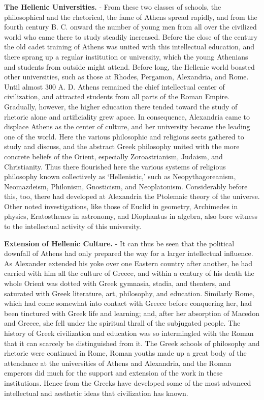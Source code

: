 \documentclass[
]{book}
\begin{document}
\textbf{The Hellenic Universities.} - From these two classes of schools, the philosophical and the rhetorical, the fame of Athens spread rapidly, and from the fourth century B. C. onward the number of young men from all over the civilized world who came there to study steadily increased. Before the close of the century the old cadet training of Athens was united with this intellectual education, and there sprang up a regular institution or university, which the young Athenians and students from outside might attend. Before long, the Hellenic world boasted other universities, such as those at Rhodes, Pergamon, Alexandria, and Rome. Until almost 300 A. D. Athens remained the chief intellectual center of civilization, and attracted students from all parts of the Roman Empire. Gradually, however, the higher education there tended toward the study of rhetoric alone and artificiality grew apace. In consequence, Alexandria came to displace Athens as the center of culture, and her university became the leading one of the world. Here the various philosophic and religious sects gathered to study and discuss, and the abstract Greek philosophy united with the more concrete beliefs of the Orient, especially Zoroastrianism, Judaism, and Christianity. Thus there flourished here the various systems of religious philosophy known collectively as `Hellenistic,' such as Neopythagoreanism, Neomazdeism, Philonism, Gnosticism, and Neoplatonism. Considerably before this, too, there had developed at Alexandria the Ptolemaic theory of the universe. Other noted investigations, like those of Euclid in geometry, Archimedes in physics, Eratosthenes in astronomy, and Diophantus in algebra, also bore witness to the intellectual activity of this university.

\textbf{Extension of Hellenic Culture.} - It can thus be seen that the political downfall of Athens had only prepared the way for a larger intellectual influence. As Alexander extended his yoke over one Eastern country after another, he had carried with him all the culture of Greece, and within a century of his death the whole Orient was dotted with Greek gymnasia, stadia, and theaters, and saturated with Greek literature, art, philosophy, and education. Similarly Rome, which had come somewhat into contact with Greece before conquering her, had been tinctured with Greek life and learning; and, after her absorption of Macedon and Greece, she fell under the spiritual thrall of the subjugated people. The history of Greek civilization and education was so intermingled with the Roman that it can scarcely be distinguished from it. The Greek schools of philosophy and rhetoric were continued in Rome, Roman youths made up a great body of the attendance at the universities of Athens and Alexandria, and the Roman emperors did much for the support and extension of the work in these institutions. Hence from the Greeks have developed some of the most advanced intellectual and aesthetic ideas that civilization has known.
\end{document}
